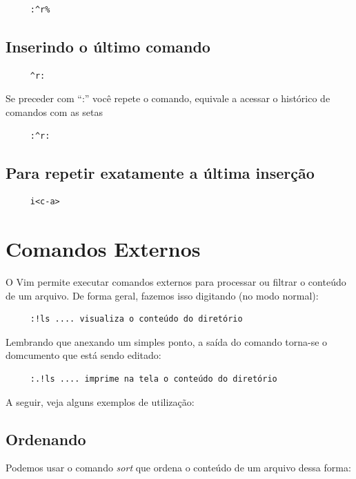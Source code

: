 \documentclass[10pt,a4paper,openany]{book}
\begin{document}
\begin{verbatim}
     :^r%
\end{verbatim}

\section{Inserindo o último comando }

\begin{verbatim}
     ^r:
\end{verbatim}

Se preceder com ``:'' você repete o comando, equivale a acessar o histórico de
comandos com as setas

\begin{verbatim}
     :^r:
\end{verbatim}

\section{Para repetir exatamente a última inserção }

\begin{verbatim}
     i<c-a>
\end{verbatim}

\chapter{Comandos Externos}
O Vim permite executar comandos externos para processar ou filtrar o
conteúdo de um arquivo. De forma geral, fazemos isso digitando (no
modo normal):

\begin{verbatim}
     :!ls .... visualiza o conteúdo do diretório
\end{verbatim}

Lembrando que anexando um simples ponto, a saída do comando torna-se o 
domcumento que está sendo editado:

\begin{verbatim}
     :.!ls .... imprime na tela o conteúdo do diretório
\end{verbatim}

A seguir, veja alguns exemplos de utilização:

\section{Ordenando}
Podemos usar o comando {\em sort} que ordena o conteúdo de um arquivo dessa forma:
\end{document}
